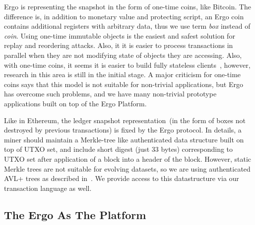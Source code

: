  Ergo is representing the snapshot in the form of one-time coins, like Bitcoin. The difference is, in addition to monetary
 value and protecting script, an Ergo coin contains additional registers with arbitrary data, thus we use term {\em box}
 instead of {\em coin}. Using one-time immutable objects is the easiest and safest solution for replay and reordering
 attacks. Also, it it is easier to process transactions in parallel when they are not modifying state of objects they
 are accessing. Also, with one-time coins, it seems it is easier to build fully stateless clients~\cite{chepurnoy2018edrax},
 however, research in this area is still in the initial stage. A major criticism for one-time coins says that this model
 is not suitable for non-trivial applications, but Ergo has overcome such problems, and we have many non-trivial
 prototype applications built on top of the Ergo Platform.

 Like in Ethereum, the ledger snapshot representation~(in the form of boxes not destroyed by
 previous transactions) is fixed by the Ergo protocol. In details, a miner should maintain a Merkle-tree like
 authenticated data structure built on top of UTXO set, and include short digest (just 33 bytes) corresponding to UTXO
 set after application of a block into a header of the block. However, static Merkle trees are not suitable for evolving
 datasets, so we are using authenticated AVL+ trees as described in~\cite{reyzin2017improving}. We provide access to
 this datastructure via our transaction language as well.

\subsection{The Ergo As The Platform}
 \label{sec:platform}



